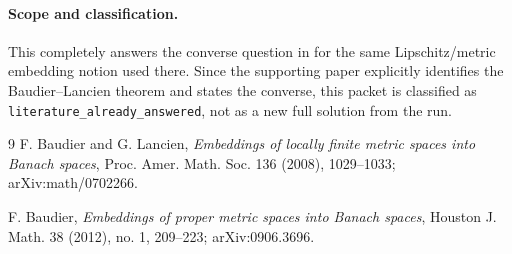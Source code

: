 \documentclass[11pt]{article}
\begin{document}
\paragraph{Scope and classification.}
This completely answers the converse question in \cite{BL} for the same
Lipschitz/metric embedding notion used there.  Since the supporting paper
explicitly identifies the Baudier--Lancien theorem and states the converse,
this packet is classified as \texttt{literature\_already\_answered}, not as a
new full solution from the run.

\begin{thebibliography}{9}
F. Baudier and G. Lancien,
\emph{Embeddings of locally finite metric spaces into Banach spaces},
Proc. Amer. Math. Soc. 136 (2008), 1029--1033;
arXiv:math/0702266.

F. Baudier,
\emph{Embeddings of proper metric spaces into Banach spaces},
Houston J. Math. 38 (2012), no. 1, 209--223;
arXiv:0906.3696.
\end{thebibliography}
\end{document}
